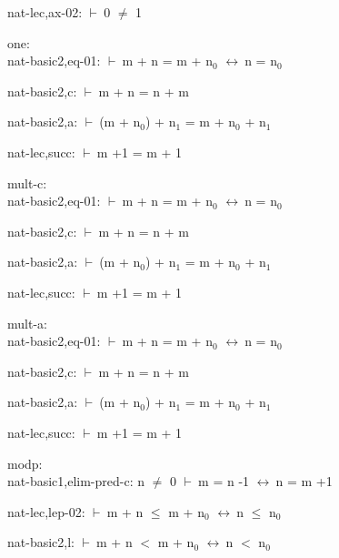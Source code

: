 \documentclass[a4paper]{article}
\newcommand{\Fol}{\mbox{$\vdash\ $}}
\newcommand{\Equiv}{\mbox{$\leftrightarrow\ $}}
\begin{document}
nat-lec,ax-02: 
 \Fol 0 $\neq$ 1



\bigskip

one:\\ nat-basic2,eq-01: 
 \Fol m + n = m + $\mbox{n}_{0}$ \Equiv n = $\mbox{n}_{0}$



nat-basic2,c: 
 \Fol m + n = n + m



nat-basic2,a: 
 \Fol (m + $\mbox{n}_{0}$) + $\mbox{n}_{1}$ = m + $\mbox{n}_{0}$ + $\mbox{n}_{1}$



nat-lec,succ: 
 \Fol m +1 = m + 1



\bigskip

mult-c:\\ nat-basic2,eq-01: 
 \Fol m + n = m + $\mbox{n}_{0}$ \Equiv n = $\mbox{n}_{0}$



nat-basic2,c: 
 \Fol m + n = n + m



nat-basic2,a: 
 \Fol (m + $\mbox{n}_{0}$) + $\mbox{n}_{1}$ = m + $\mbox{n}_{0}$ + $\mbox{n}_{1}$



nat-lec,succ: 
 \Fol m +1 = m + 1



\bigskip

mult-a:\\ nat-basic2,eq-01: 
 \Fol m + n = m + $\mbox{n}_{0}$ \Equiv n = $\mbox{n}_{0}$



nat-basic2,c: 
 \Fol m + n = n + m



nat-basic2,a: 
 \Fol (m + $\mbox{n}_{0}$) + $\mbox{n}_{1}$ = m + $\mbox{n}_{0}$ + $\mbox{n}_{1}$



nat-lec,succ: 
 \Fol m +1 = m + 1



\bigskip

modp:\\ nat-basic1,elim-pred-c: 
n $\neq$ 0
 \Fol m = n -1 \Equiv n = m +1



nat-lec,lep-02: 
 \Fol m + n $\le$ m + $\mbox{n}_{0}$ \Equiv n $\le$ $\mbox{n}_{0}$



nat-basic2,l: 
 \Fol m + n $<$ m + $\mbox{n}_{0}$ \Equiv n $<$ $\mbox{n}_{0}$
\end{document}
